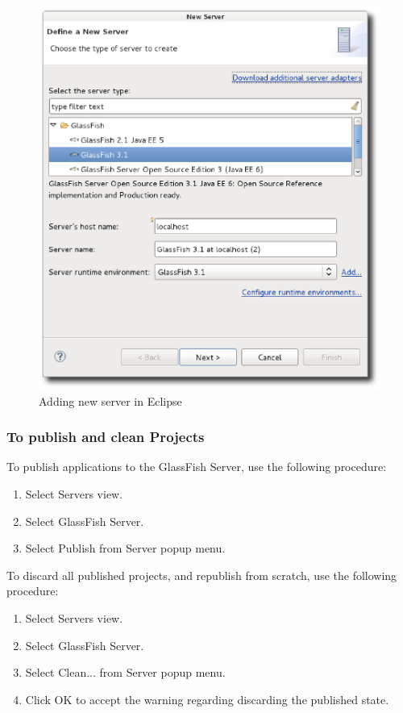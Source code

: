 \begin{figure}
  \begin{center}
  \includegraphics[scale=0.8]{Figures/Eclipse_adding_new_server.eps}
  \end{center}
  \caption{Adding new server in Eclipse}
  \label{Adding new server in Eclipse}
\end{figure}
\pagebreak

\subsubsection{To publish and clean Projects}
To publish applications to the GlassFish Server, use the following procedure:
\begin{enumerate}
\item Select Servers view.
\item Select GlassFish Server.
\item Select Publish from Server popup menu.
\end{enumerate}

To discard all published projects, and republish from scratch, use the following procedure:
\begin{enumerate}
\item Select Servers view.
\item Select GlassFish Server.
\item Select Clean... from Server popup menu.
\item Click OK to accept the warning regarding discarding the published state.
\end{enumerate}

